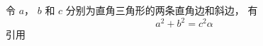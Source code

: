 
令 $a$， $b$ 和 $c$ 分别为直角三角形的两条直角边和斜边， 有
\begin{equation}\label{test_eq1}
a^2 + b^2 = c^2α
\end{equation}
引用
